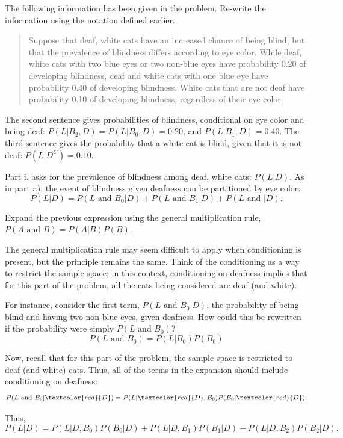 \begin{examplewrap}
\begin{nexample}{The following information has been given in the problem. Re-write the information using the notation defined earlier.
		\begin{quote}
			Suppose that deaf, white cats have an increased chance of being blind, but that the prevalence of blindness differs according to eye color. While deaf, white cats with two blue eyes or two non-blue eyes have probability 0.20 of developing blindness, deaf and white cats with one blue eye have probability 0.40 of developing blindness. White cats that are not deaf have probability 0.10 of developing blindness, regardless of their eye color.
		\end{quote}}

The second sentence gives probabilities of blindness, conditional on eye color and being deaf: $P(L|B_2, D) = P(L|B_0, D) = 0.20$, and $P(L|B_1, D) = 0.40$. The third sentence gives the probability that a white cat is blind, given that it is not deaf: $P(L|D^C) = 0.10$.  
\end{nexample}
\end{examplewrap}

Part i. asks for the prevalence of blindness among deaf, white cats: $P(L|D)$. As in part a), the event of blindness given deafness can be partitioned by eye color:
\[P(L|D) = P(L \textrm{ and } B_0|D) + P(L \textrm{ and } B_1 | D) + P(L \textrm{ and } |D).\]

\begin{examplewrap}
\begin{nexample}{Expand the previous expression using the general multiplication rule, $P(A \textrm{ and } B) = P(A|B)P(B)$.}
	
	The general multiplication rule may seem difficult to apply when conditioning is present, but the principle remains the same. Think of the conditioning as a way to restrict the sample space; in this context, conditioning on deafness implies that for this part of the problem, all the cats being considered are deaf (and white). 
	
	For instance, consider the first term, $P(L \textrm{ and } B_0|D)$, the probability of being blind and having two non-blue eyes, given deafness. How could this be rewritten if the probability were simply $P(L \textrm{ and } B_0)$? 
	\[P(L \textrm{ and } B_0) = P(L|B_0)P(B_0) \]
	
	Now, recall that for this part of the problem, the sample space is restricted to deaf (and white) cats. Thus, all of the terms in the expansion should include conditioning on deafness:
	\[P(L \textrm{ and } B_0|\textcolor{red}{D}) = P(L|\textcolor{red}{D}, B_0)P(B_0|\textcolor{red}{D}). \]
	
	Thus, 
	\[P(L|D) = P(L|D, B_0)P(B_0|D) + P(L|D, B_1)P(B_1|D) + P(L|D, B_2)P(B_2|D).\]
\end{nexample}
\end{examplewrap}

